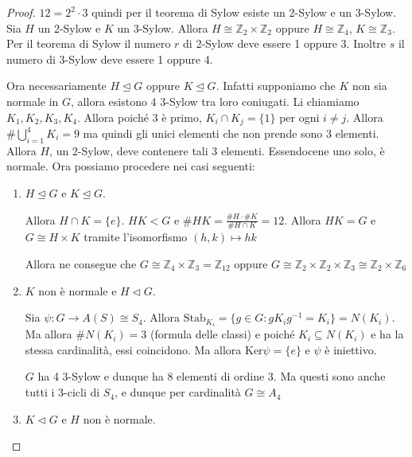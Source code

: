 \begin{proof}
    \(12 = 2^2 \cdot 3\) quindi per il teorema di Sylow esiste un 2-Sylow e un
    3-Sylow. Sia \(H\) un 2-Sylow e \(K\) un 3-Sylow. Allora \(H \cong
    \mathbb{Z}_2 \times \mathbb{Z}_2\) oppure \(H \cong \mathbb{Z}_4\), \(K
    \cong \mathbb{Z}_3\). Per il teorema di Sylow il numero \(r\) di 2-Sylow
    deve essere 1 oppure 3. %
    Inoltre \(s\) il numero di 3-Sylow deve essere 1 oppure 4. %

    Ora necessariamente \(H \trianglelefteq G\) oppure \(K \trianglelefteq G\).
    Infatti supponiamo che \(K\) non sia normale in \(G\), allora esistono 4
    3-Sylow tra loro coniugati. %
    Li chiamiamo \(K_{1}, K_{2}, K_{3}, K_{4}\). Allora poiché 3 è primo,
    \(K_{i} \cap K_{j} = \{1\} \) per ogni \(i\neq j\). Allora
    \(\# \bigcup_{i=1}^{4} K_{i} = 9 \)  ma quindi gli unici elementi che non
    prende sono 3 elementi. Allora \(H\), un 2-Sylow, deve contenere tali 3
    elementi. Essendocene uno solo, è normale. Ora possiamo procedere nei casi
    seguenti:
\begin{enumerate}[label = \arabic*.]
    \item \(H \trianglelefteq G\) e \(K \trianglelefteq G\).

        Allora \(H \cap K = \{e\} \). \(HK < G\) e \(\# HK = \frac{\# H \cdot \#
        K}{\# H \cap K} = 12\). Allora \(HK = G\) e \(G \cong H \times K\)
        tramite l'isomorfismo \({(h, k)} \mapsto hk\) 

        Allora ne consegue che \(G \cong \mathbb{Z}_4 \times \mathbb{Z}_3 =
        \mathbb{Z}_{12} \) oppure \(G \cong \mathbb{Z}_2 \times \mathbb{Z}_2
        \times \mathbb{Z}_3 \cong \mathbb{Z}_2 \times \mathbb{Z}_6\) 

    \item \(K\) non è normale e \(H \triangleleft G\).

    Sia \(\psi : G \to A{(S)} \cong S_{4}\).
    Allora \(\mathrm{Stab}_{K_{i}}  = \{g \in G : gK_{i}g^{-1} = K_{i}\} =
    N{(K_{i})}\). Ma allora \(\# N{(K_{i})} = 3\) (formula delle classi) e
    poiché \(K_{i} \subseteq N{(K_{i})} \) e ha la stessa cardinalità, essi
    coincidono. 
     Ma allora \(\mathrm{Ker}\psi = \{e\} \) e \(\psi\) è iniettivo.

     \(G\) ha 4 3-Sylow e dunque ha \(8\) elementi di ordine 3. Ma questi sono
     anche tutti i 3-cicli di \(S_{4}\), e dunque per cardinalità \(G \cong A_{4}\)  

     \item \(K \triangleleft G\) e \(H\) non è normale.
        
        
\end{enumerate}



\end{proof}



